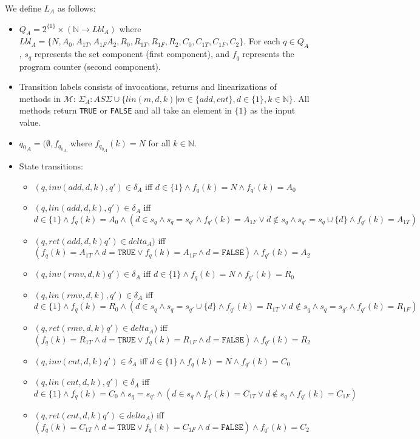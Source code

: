 We define $L_A$ as follows:
\begin{itemize}
\item $Q_A = 2^{\{1\}} \times (\mathbb{N} \rightarrow Lbl_A)$ where $Lbl_A = \{N, A_0, A_{1T}, A_{1F} A_2, R_0, R_{1T}, R_{1F}, R_2, C_0, C_{1T}, C_{1F}, C_2 \}$. For each $q \in Q_A$, $s_q$ represents the set component (first component), and $f_q$ represents the program counter (second component).
\item Transition labels consists of invocations, returns and linearizations of methods in $\mathcal{M}$: $\Sigma_A: AS\Sigma \cup \{lin(m,d,k)| m \in \{add,cnt\}, d\in \{1\}, k \in \mathbb{N} \}$. All methods return \texttt{TRUE} or \texttt{FALSE} and all take an element in $\{1\}$ as the input value.
\item ${q_0}_A = (\emptyset, f_{{q_0}_A}$ where $f_{{q_0}_A}(k) = N$ for all $k \in \mathbb{N}$.
\item State transitions:
\begin{itemize}
\item $(q, inv(add, d,k), q') \in \delta_A$ iff $d \in \{1\} \wedge f_q(k) = N \wedge f_{q'}(k) = A_0$
\item $(q, lin(add,d,k), q') \in \delta_A$ iff $d \in \{1\} \wedge f_q(k) = A_0 \wedge (d \in s_q \wedge s_q = s_{q'} \wedge f_{q'}(k) = A_{1F} \vee d \notin s_q \wedge s_{q'} = s_q \cup \{d\} \wedge f_{q'}(k) = A_{1T})$
\item $(q, ret(add,d,k) q') \in delta_A)$ iff $(f_q(k) = A_{1T} \wedge d = \texttt{TRUE} \vee f_q(k) = A_{1F} \wedge d = \texttt{FALSE}) \wedge f_{q'}(k) = A_2$
\item $(q, inv(rmv,d,k) q') \in \delta_A$ iff $d \in \{1\} \wedge f_q(k) = N \wedge f_{q'}(k)= R_0 $
\item $(q, lin(rmv,d,k), q') \in \delta_A$ iff $d \in \{1\} \wedge f_q(k) = R_0 \wedge (d \in s_q \wedge s_q = s_{q'} \cup \{d\} \wedge f_{q'}(k) = R_{1T} \vee d \notin s_q \wedge s_q = s_{q'} \wedge f_{q'}(k) = R_{1F} )$
\item $(q, ret(rmv,d,k) q') \in delta_A)$ iff $(f_q(k) = R_{1T} \wedge d = \texttt{TRUE} \vee f_q(k) = R_{1F} \wedge d = \texttt{FALSE}) \wedge f_{q'}(k) = R_2$
\item $(q, inv(cnt,d,k) q') \in \delta_A$ iff $d \in \{1\} \wedge f_q(k) = N \wedge f_{q'}(k)= C_0 $
\item $(q, lin(cnt,d,k), q') \in \delta_A$ iff $d \in \{1\} \wedge f_q(k) = C_0 \wedge s_q = s_{q'} \wedge (d \in s_q \wedge f_{q'}(k) = C_{1T} \vee d \notin s_q \wedge f_{q'}(k) = C_{1F} )$
\item $(q, ret(cnt,d,k) q') \in delta_A)$ iff $(f_q(k) = C_{1T} \wedge d = \texttt{TRUE} \vee f_q(k) = C_{1F} \wedge d = \texttt{FALSE}) \wedge f_{q'}(k) = C_2$
\end{itemize}
\end{itemize}

